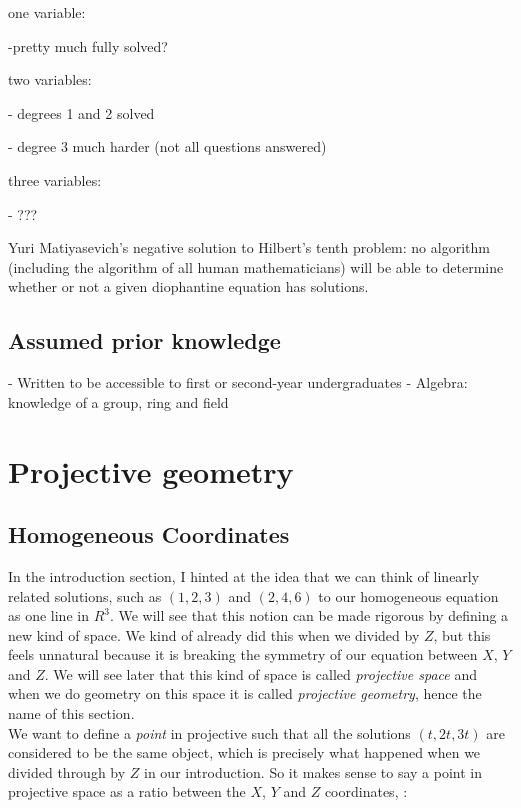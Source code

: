 \documentclass{article}
\begin{document}
one variable:

-pretty much fully solved?

two variables:

- degrees 1 and 2 solved

- degree 3 much harder (not all questions answered)

three variables:

- ???

Yuri Matiyasevich's negative solution to Hilbert's tenth problem: no algorithm (including the algorithm of all human mathematicians) will be able to determine whether or not a given diophantine equation has solutions.

\subsection{Assumed prior knowledge}

- Written to be accessible to first or second-year undergraduates
- Algebra: knowledge of a group, ring and field

\newpage

\section{Projective geometry}

\subsection{Homogeneous Coordinates}

In the introduction section, I hinted at the idea that we can think of linearly related solutions, such as $(1, 2, 3)$ and $(2, 4, 6)$ to our homogeneous equation  as one line in $R^3$. We will see that this notion can be made rigorous by defining a new kind of space. We kind of already did this when we divided by $Z$, but this feels unnatural because it is breaking the symmetry of our equation between $X$, $Y$ and $Z$. We will see later that this kind of space is called \emph{projective space} and when we do geometry on this space it is called \emph{projective geometry}, hence the name of this section.\\

We want to define a \emph{point} in projective such that all the solutions $(t, 2t, 3t)$ are considered to be the same object, which is precisely what happened when we divided through by $Z$ in our introduction. So it makes sense to say a point in projective space as a ratio between the $X$, $Y$ and $Z$ coordinates, :\\
\end{document}

